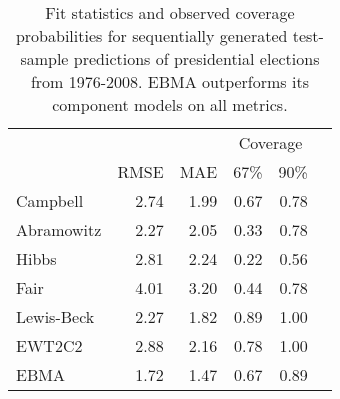 
\begin{table}[p]
  \caption{\footnotesize Fit statistics and observed coverage
    probabilities for sequentially generated test-sample predictions
    of presidential elections from 1976-2008.  EBMA outperforms its
    component models on all metrics.}
\label{Pres-Res} \small
\begin{center}
\begin{tabular}{lrrrrr}
\toprule
                        &              &              & \multicolumn{2}{c}{Coverage} \\ 
                    	&	RMSE&	MAE	&67\% &   90\%      \\
\midrule
Campbell & 2.74 & 1.99 & 0.67 & 0.78 \\ 
  Abramowitz & 2.27 & 2.05 & 0.33 & 0.78 \\ 
  Hibbs & 2.81 & 2.24 & 0.22 & 0.56 \\ 
  Fair & 4.01 & 3.20 & 0.44 & 0.78 \\ 
  Lewis-Beck & 2.27 & 1.82 & 0.89 & 1.00 \\ 
  EWT2C2 & 2.88 & 2.16 & 0.78 & 1.00 \\ 
  EBMA & 1.72 & 1.47 & 0.67 & 0.89 \\
\bottomrule
\end{tabular}
\end{center}
\end{table}


